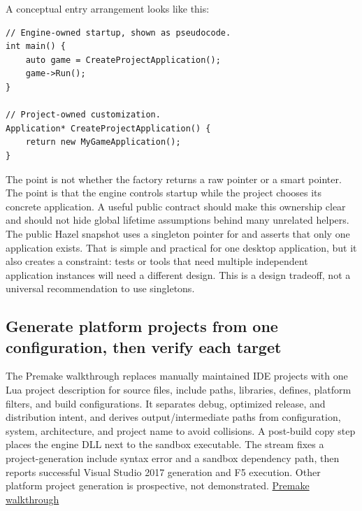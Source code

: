 A conceptual entry arrangement looks like this:

\begin{verbatim}
// Engine-owned startup, shown as pseudocode.
int main() {
    auto game = CreateProjectApplication();
    game->Run();
}

// Project-owned customization.
Application* CreateProjectApplication() {
    return new MyGameApplication();
}
\end{verbatim}

The point is not whether the factory returns a raw pointer or a smart pointer. The point is that the engine controls startup while the project chooses its concrete application. A useful public contract should make this ownership clear and should not hide global lifetime assumptions behind many unrelated helpers. The public Hazel snapshot uses a singleton pointer for  and asserts that only one application exists. That is simple and practical for one desktop application, but it also creates a constraint: tests or tools that need multiple independent application instances will need a different design. This is a design tradeoff, not a universal recommendation to use singletons.

\subsection{Generate platform projects from one configuration, then verify each target}\label{05-engine-i-ch013-generate-platform-projects-from-one-configuration-then-verify-each-target}

\hypertarget{05-engine-i-ch013-generate-platform-projects-from-one-configuration-then-verify-each-target}{}

The Premake walkthrough replaces manually maintained IDE projects with one Lua project description for source files, include paths, libraries, defines, platform filters, and build configurations. It separates debug, optimized release, and distribution intent, and derives output/intermediate paths from configuration, system, architecture, and project name to avoid collisions. A post-build copy step places the engine DLL next to the sandbox executable. The stream fixes a project-generation include syntax error and a sandbox dependency path, then reports successful Visual Studio 2017 generation and F5 execution. Other platform project generation is prospective, not demonstrated. \href{https://www.youtube.com/watch?v=sULV3aB2qeU}{Premake walkthrough}

